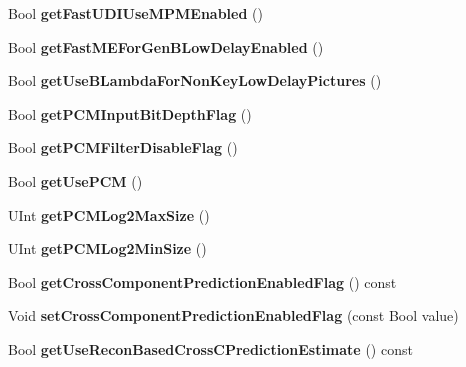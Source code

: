\begin{DoxyCompactItemize}
Bool {\bfseries get\+Fast\+U\+D\+I\+Use\+M\+P\+M\+Enabled} ()
\item 
\mbox{\label{class_t_enc_cfg_aaea7f2b247ef88e0d2eacddd57c9e44c}} 
Bool {\bfseries get\+Fast\+M\+E\+For\+Gen\+B\+Low\+Delay\+Enabled} ()
\item 
\mbox{\label{class_t_enc_cfg_a31a8f4cda69f494e56913490737aa8e0}} 
Bool {\bfseries get\+Use\+B\+Lambda\+For\+Non\+Key\+Low\+Delay\+Pictures} ()
\item 
\mbox{\label{class_t_enc_cfg_ad0a986f5419382f07d86bcb5a870b072}} 
Bool {\bfseries get\+P\+C\+M\+Input\+Bit\+Depth\+Flag} ()
\item 
\mbox{\label{class_t_enc_cfg_af1f824db5df14e3b1403def5962fdb2c}} 
Bool {\bfseries get\+P\+C\+M\+Filter\+Disable\+Flag} ()
\item 
\mbox{\label{class_t_enc_cfg_a977e8528e0baf9252044b2d86f9d442b}} 
Bool {\bfseries get\+Use\+P\+CM} ()
\item 
\mbox{\label{class_t_enc_cfg_a961e65e6927c9ba761f932c38af4395b}} 
U\+Int {\bfseries get\+P\+C\+M\+Log2\+Max\+Size} ()
\item 
\mbox{\label{class_t_enc_cfg_a2305af3f553512bc6444121d2111c2ac}} 
U\+Int {\bfseries get\+P\+C\+M\+Log2\+Min\+Size} ()
\item 
\mbox{\label{class_t_enc_cfg_a0e757faf4231436401b9e6780353a74a}} 
Bool {\bfseries get\+Cross\+Component\+Prediction\+Enabled\+Flag} () const
\item 
\mbox{\label{class_t_enc_cfg_ac8b14da85377c96dccbe94c248eaf0c4}} 
Void {\bfseries set\+Cross\+Component\+Prediction\+Enabled\+Flag} (const Bool value)
\item 
\mbox{\label{class_t_enc_cfg_a75a66c5a35192db1b237f31f5992514f}} 
Bool {\bfseries get\+Use\+Recon\+Based\+Cross\+C\+Prediction\+Estimate} () const
\item 
\mbox{\label{class_t_enc_cfg_a1420c8c3ba96156ec29d2b82c90a076e}} 

\end{DoxyCompactItemize}
